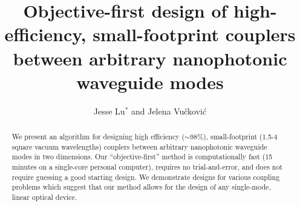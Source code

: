 \documentclass[letterpaper,10pt]{article}
\begin{document}
\title{Objective-first design of 
    high-efficiency, small-footprint couplers between 
    arbitrary nanophotonic waveguide modes}
\author{Jesse Lu$^\ast$ and Jelena Vu\v{c}kovi\'{c}}
\address{Stanford University, Stanford, California, USA.}

\maketitle
\begin{abstract}
We present an algorithm for designing
    high efficiency ($\sim$98\%), 
    small-footprint (1.5-4 square vacuum wavelengths)
    couplers between arbitrary nanophotonic waveguide modes
    in two dimensions.
Our ``objective-first'' method is
    computationally fast (15 minutes on a single-core personal computer), 
    requires no trial-and-error, and
    does not require guessing a good starting design.
We demonstrate designs for various coupling problems which suggest 
    that our method allows for the design of any 
    single-mode, linear optical device.
\end{abstract}
\end{document}
